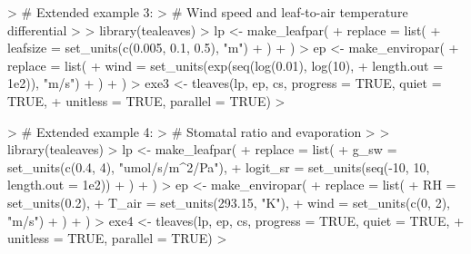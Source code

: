 \documentclass[11pt, oneside]{article}
\begin{document}
\clearpage

\begin{Schunk}
\begin{Sinput}
> # Extended example 3: 
> # Wind speed and leaf-to-air temperature differential
> 
> library(tealeaves)
> lp  <- make_leafpar(
+   replace = list(
+     leafsize = set_units(c(0.005, 0.1, 0.5), "m")
+   )
+ )
> ep <- make_enviropar(
+   replace = list(
+     wind = set_units(exp(seq(log(0.01), log(10), 
+                              length.out = 1e2)), "m/s")
+   )
+ )
> exe3 <- tleaves(lp, ep, cs, progress = TRUE, quiet = TRUE, 
+                 unitless = TRUE, parallel = TRUE)
> 
\end{Sinput}
\end{Schunk}

\clearpage

\begin{Schunk}
\begin{Sinput}
> # Extended example 4: 
> # Stomatal ratio and evaporation
> 
> library(tealeaves)
> lp  <- make_leafpar(
+   replace = list(
+     g_sw = set_units(c(0.4, 4), "umol/s/m^2/Pa"),
+     logit_sr = set_units(seq(-10, 10, length.out = 1e2))
+   )
+ )
> ep <- make_enviropar(
+   replace = list(
+     RH = set_units(0.2),
+     T_air = set_units(293.15, "K"),
+     wind = set_units(c(0, 2), "m/s")
+   )
+ )
> exe4 <- tleaves(lp, ep, cs, progress = TRUE, quiet = TRUE, 
+                 unitless = TRUE, parallel = TRUE)
> 
\end{Sinput}
\end{Schunk}
\end{document}
